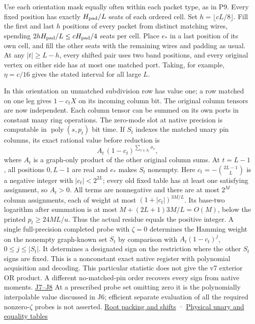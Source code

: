 \documentclass[11pt,a4paper]{article}
\begin{document}
Use each orientation mask equally often within each packet type, as in
P9. Every fixed position has exactly \(H_{\rm pad}/L\) seats of each
ordered cell. Set \(h=\lfloor cL/8\rfloor\). Fill the first and last
\(h\) positions of every packet from distinct matching wires, spending
\(2hH_{\rm pad}/L\le c H_{\rm pad}/4\) seats per cell. Place \(e_*\) in
a last position of its own cell, and fill the other seats with the
remaining wires and padding as usual. At any \(|t|\ge L-h\), every
shifted pair uses two band positions, and every original vertex on
either side has at most one matched port. Taking, for example,
\(\eta=c/16\) gives the stated interval for all large \(L\).

In this orientation an unmatched subdivision row has value one; a row
matched on one leg gives \(1-c_tX\) on its incoming column bit. The
original column tensors are now independent. Each column tensor can be
summed on its own ports in constant many ring operations. The zero-mode
slot at native precision is computable in \(\operatorname{poly}(s,p_t)\)
bit time. If \(S_t\) indexes the matched unary pin columns, its exact
rational value before reduction is \[
                A_t\, (1-c_t)^{\sum_{v\in S_t}\sigma_v},
\] where \(A_t\) is a graph-only product of the other original column
sums. At \(t=L-1\), all positions \(0,L-1\) are real and \(e_*\) makes
\(S_t\) nonempty. Here \(c_t=-\binom{2L-1}{L}\) is a negative integer
with \(|c_t|<2^{2L}\); every old fixed table has at least one satisfying
assignment, so \(A_t>0\). All terms are nonnegative and there are at
most \(2^M\) column assignments, each of weight at most
\((1+|c_t|)^{3M/L}\). Its base-two logarithm after summation is at most
\(M+(2L+1)3M/L=O(M)\), below the printed \(p_t\ge24ML/u\). Thus the
actual residue equals the positive integer. A single full-precision
completed probe with \(\zeta=0\) determines the Hamming weight on the
nonempty graph-known set \(S_t\) by comparison with \(A_t(1-c_t)^j\),
\(0\le j\le|S_t|\). It determines a designated sign on the restriction
where the other \(S_t\) signs are fixed. This is a nonconstant exact
native register with polynomial acquisition and decoding. This
particular statistic does not give the v7 exterior OR product. A
different no-matched-pin order recovers every sign from native moments.
\hyperref[v9-section-moment-escape]{J7--J8} At a prescribed probe set
omitting zero it is the polynomially interpolable value discussed in J6;
efficient separate evaluation of all the required nonzero-\(\zeta\)
probes is not asserted.
\href{https://github.com/openai/math/blob/main/preprints/The-Exponential-Time-Hypothesis-is-False-October-25-2026/build/quantitative-contraction.tex\#L114}{Root
packing and shifts} ·
\href{https://github.com/openai/math/blob/main/preprints/The-Exponential-Time-Hypothesis-is-False-October-25-2026/build/quantitative-reduction.tex\#L65}{Physical
unary and equality tables}
\end{document}
